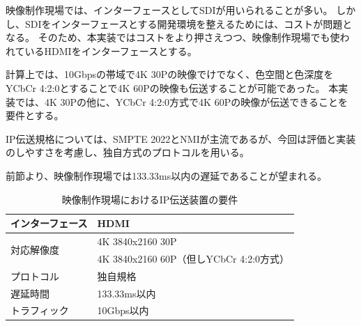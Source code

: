 映像制作現場では、インターフェースとしてSDIが用いられることが多い。
しかし、SDIをインターフェースとする開発環境を整えるためには、コストが問題となる。
そのため、本実装ではコストをより押さえつつ、映像制作現場でも使われているHDMIをインターフェースとする。

計算上では、10Gbpsの帯域で4K 30Pの映像でけでなく、色空間と色深度をYCbCr 4:2:0とすることで4K 60Pの映像も伝送することが可能であった。
本実装では、4K 30Pの他に、YCbCr 4:2:0方式で4K 60Pの映像が伝送できることを要件とする。

IP伝送規格については、SMPTE 2022とNMIが主流であるが、今回は評価と実装のしやすさを考慮し、独自方式のプロトコルを用いる。

前節より、映像制作現場では133.33ms以内の遅延であることが望まれる。

\begin{table}[htbp]
  \caption{映像制作現場におけるIP伝送装置の要件}
  \label{tb:ip-youken}
  \begin{center}
  \begin{tabular}{l|l}
    \hline
    インターフェース   & HDMI \\\hline
    \multirow{2}{*}{対応解像度} & 4K 3840x2160 30P \\\cline{2-2}
                              & 4K 3840x2160 60P（但しYCbCr 4:2:0方式）  \\\hline
    プロトコル        & 独自規格 \\\hline
    遅延時間          & 133.33ms以内 \\\hline
    トラフィック      & 10Gbps以内 \\\hline
  \end{tabular}\end{center}
\end{table}
